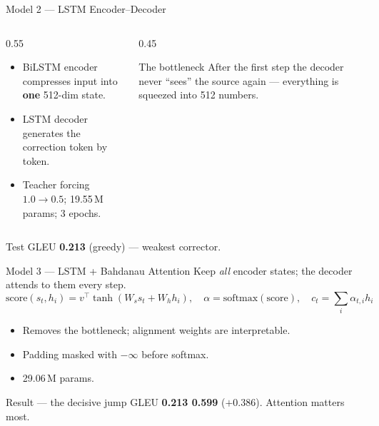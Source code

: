 \documentclass[aspectratio=169,11pt]{beamer}
\begin{document}
\begin{frame}{Model 2 --- LSTM Encoder--Decoder}
\begin{columns}
\begin{column}{0.55\textwidth}
\begin{itemize}
  \item BiLSTM encoder compresses input into \textbf{one} 512-dim state.
  \item LSTM decoder generates the correction token by token.
  \item Teacher forcing $1.0 \to 0.5$; 19.55\,M params; 3 epochs.
\end{itemize}
\end{column}
\begin{column}{0.45\textwidth}
\begin{block}{The bottleneck}
After the first step the decoder never ``sees'' the source again ---
everything is squeezed into 512 numbers.
\end{block}
\end{column}
\end{columns}
\vspace{0.6em}
\centering Test GLEU \textbf{0.213} (greedy) --- weakest corrector.
\end{frame}

\begin{frame}{Model 3 --- LSTM + Bahdanau Attention}
Keep \emph{all} encoder states; the decoder attends to them every step.
\vspace{0.6em}
\[
\text{score}(s_t,h_i)=v^{\top}\tanh(W_s s_t + W_h h_i),\quad
\alpha=\mathrm{softmax}(\text{score}),\quad
c_t=\textstyle\sum_i \alpha_{t,i} h_i
\]
\begin{itemize}
  \item Removes the bottleneck; alignment weights are interpretable.
  \item Padding masked with $-\infty$ before softmax.
  \item 29.06\,M params.
\end{itemize}
\begin{block}{Result --- the decisive jump}
GLEU \textbf{0.213 \textrightarrow{} 0.599} ($+0.386$). Attention matters most.
\end{block}
\end{frame}
\end{document}
